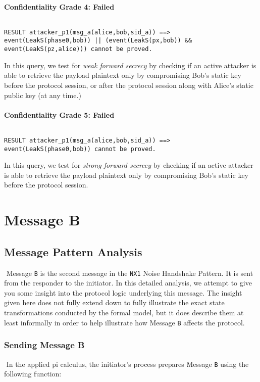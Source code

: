 \paragraph{Confidentiality Grade 4: Failed}$ $
\begin{lstlisting}
RESULT attacker_p1(msg_a(alice,bob,sid_a)) ==> event(LeakS(phase0,bob)) || (event(LeakS(px,bob)) && event(LeakS(pz,alice))) cannot be proved.
\end{lstlisting}

In this query, we test for \emph{weak forward secrecy} by checking if an active attacker is able to retrieve the payload plaintext only by compromising Bob's static key before the protocol session, or after the protocol session along with Alice's static public key (at any time.)


\paragraph{Confidentiality Grade 5: Failed}$ $
\begin{lstlisting}
RESULT attacker_p1(msg_a(alice,bob,sid_a)) ==> event(LeakS(phase0,bob)) cannot be proved.
\end{lstlisting}

In this query, we test for \emph{strong forward secrecy} by checking if an active attacker is able to retrieve the payload plaintext only by compromising Bob's static key before the protocol session.


\section{ Message B}

\subsection{Message Pattern Analysis}$ $
Message \texttt{B} is the second message in the \texttt{NX1} Noise Handshake Pattern. It is sent from the responder to the initiator. In this detailed analysis, we attempt to give you some insight into the protocol logic underlying this message. The insight given here does not fully extend down to fully illustrate the exact state transformations conducted by the formal model, but it does describe them at least informally in order to help illustrate how Message \texttt{B} affects the protocol.


\subsubsection{Sending Message B}$ $
In the applied pi calculus, the initiator's process prepares Message \texttt{B} using the following function:


